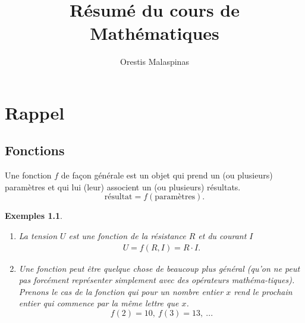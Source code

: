 \documentclass[a4paper,12pt]{book}
\title{Résumé du cours de Mathématiques}
\author{Orestis Malaspinas}
\newtheorem*{exemples}{Exemples}
\begin{document}
\maketitle

\chapter{Rappel}

\section{Fonctions}
Une fonction $f$ de façon générale est un objet qui prend un (ou plusieurs) paramètres et qui lui (leur) associent un (ou plusieurs) résultats. 
\begin{equation*}
\mbox{résultat}=f(\mbox{paramètres}).
\end{equation*}
\begin{exemples}\hfill\break

\begin{enumerate}
\item La tension $U$ est une fonction de la résistance $R$ et du courant $I$ 
\begin{align}
U=f(R,I)=R\cdot I.
\end{align}
\item Une fonction peut être quelque chose de beaucoup plus général (qu'on ne peut pas forcément représenter simplement avec des opérateurs mathéma-tiques). Prenons le cas de la fonction qui pour un nombre entier $x$ rend le prochain entier qui commence par la même lettre que $x$.
\begin{equation}
f(2)=10,\ f(3)=13,\ ...
\end{equation}
\end{enumerate}
\end{exemples}
\end{document}
